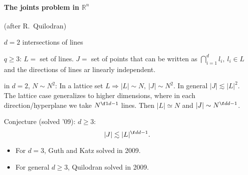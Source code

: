\paragraph{The joints problem in $ℝ^n$} (after R.\ Quilodran)

$d=2$ intersections of lines

$q\geq 3$: $L=$ set of lines. $J=$ set of points that can be written as $\bigcap_{i=1}^dl_i,\ l_i∈L$ and the directions of lines ar linearly independent.

in $d=2$, $N\sim N^2$: In a lattice set $L⇒|L|\sim N,\ |J|\sim N^2$. In general $|J|\lesssim|L|^2$. The lattice case generalizes to higher dimensions, where in each direction/hyperplane we take $N^{\f1{d-1}}$ lines. Then $|L|\simeq N$ and $|J|\sim N^{\f d{d-1}}$.

Conjecture (solved '09): $d\geq 3$: \[|J|\lesssim|L|^{\f d{d-1}}.\]
\begin{itemize}
	\item For $d=3$, Guth and Katz solved in 2009.
	\item For general $d\geq 3$, Quilodran solved in 2009.
\end{itemize}

